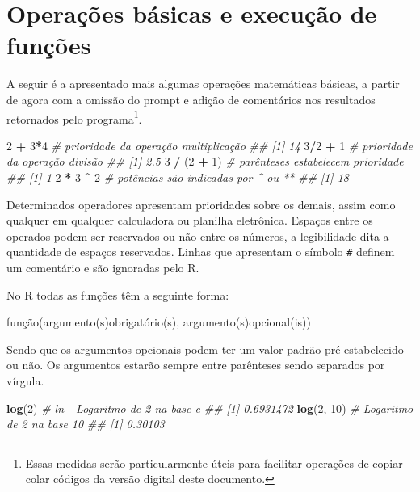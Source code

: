 \documentclass[
  11pt,
  a5paper,
  openany]{book}
\newenvironment{Shaded}{\begin{snugshade}}{\end{snugshade}}
\newcommand{\CommentTok}[1]{\textcolor[rgb]{0.56,0.35,0.01}{\textit{#1}}}
\newcommand{\DecValTok}[1]{\textcolor[rgb]{0.00,0.00,0.81}{#1}}
\newcommand{\KeywordTok}[1]{\textcolor[rgb]{0.13,0.29,0.53}{\textbf{#1}}}
\newcommand{\NormalTok}[1]{#1}
\newcommand{\OperatorTok}[1]{\textcolor[rgb]{0.81,0.36,0.00}{\textbf{#1}}}
\newcommand{\StringTok}[1]{\textcolor[rgb]{0.31,0.60,0.02}{#1}}
\begin{document}
\hypertarget{operauxe7uxf5es-buxe1sicas-e-execuuxe7uxe3o-de-funuxe7uxf5es}{%
\section{Operações básicas e execução de funções}\label{operauxe7uxf5es-buxe1sicas-e-execuuxe7uxe3o-de-funuxe7uxf5es}}

A seguir é a apresentado mais algumas operações matemáticas básicas, a partir de agora com a omissão do prompt e adição de comentários nos resultados retornados pelo programa\footnote{Essas medidas serão particularmente úteis para facilitar operações de copiar-colar códigos da versão digital deste documento.}.

\begin{Shaded}
\begin{Highlighting}[]
\DecValTok{2} \OperatorTok{+}\StringTok{ }\DecValTok{3}\OperatorTok{*}\DecValTok{4} \CommentTok{# prioridade da operação multiplicação}
\CommentTok{## [1] 14}
\DecValTok{3}\OperatorTok{/}\DecValTok{2} \OperatorTok{+}\StringTok{ }\DecValTok{1} \CommentTok{# prioridade da operação divisão}
\CommentTok{## [1] 2.5}
\DecValTok{3} \OperatorTok{/}\StringTok{ }\NormalTok{(}\DecValTok{2} \OperatorTok{+}\StringTok{ }\DecValTok{1}\NormalTok{) }\CommentTok{# parênteses estabelecem prioridade}
\CommentTok{## [1] 1}
\DecValTok{2} \OperatorTok{*}\StringTok{ }\DecValTok{3} \OperatorTok{^}\StringTok{ }\DecValTok{2} \CommentTok{# potências são indicadas por ^ ou **  }
\CommentTok{## [1] 18}
\end{Highlighting}
\end{Shaded}

Determinados operadores apresentam prioridades sobre os demais, assim como qualquer em qualquer calculadora ou planilha eletrônica. Espaços entre os operados podem ser reservados ou não entre os números, a legibilidade dita a quantidade de espaços reservados. Linhas que apresentam o símbolo \texttt{\#} definem um comentário e são ignoradas pelo R.

No R todas as funções têm a seguinte forma:

função(argumento(s)obrigatório(s), argumento(s)opcional(is))

Sendo que os argumentos opcionais podem ter um valor padrão pré-estabelecido ou não. Os argumentos estarão sempre entre parênteses sendo separados por vírgula.

\begin{Shaded}
\begin{Highlighting}[]
\KeywordTok{log}\NormalTok{(}\DecValTok{2}\NormalTok{) }\CommentTok{# ln - Logaritmo de 2 na base e}
\CommentTok{## [1] 0.6931472}
\KeywordTok{log}\NormalTok{(}\DecValTok{2}\NormalTok{, }\DecValTok{10}\NormalTok{) }\CommentTok{# Logaritmo de 2 na base 10}
\CommentTok{## [1] 0.30103}
\end{Highlighting}
\end{Shaded}
\end{document}
